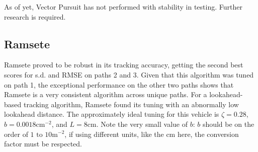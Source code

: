 \documentclass[mla7]{mla}
\begin{document}
\begin{paper}
As of yet, Vector Pursuit has not performed with stability in testing. Further research is required.

\subsection{Ramsete}

Ramsete proved to be robust in its tracking accuracy, getting the second best scores for s.d. and RMSE on paths 2 and 3. Given that this algorithm was tuned on path 1, the exceptional performance on the other two paths shows that Ramsete is a very consistent algorithm across unique paths. For a lookahead-based tracking algorithm, Ramsete found its tuning with an abnormally low lookahead distance. The approximately ideal tuning for this vehicle is $\zeta=0.28$, $b=0.0018\text{cm}^{-2}$, and $L=8$cm. Note the very small value of $b$: $b$ should be on the order of $1\text{ to }10\text{m}^{-2}$, if using different units, like the cm here, the conversion factor must be respected.


\end{paper}
\end{document}

